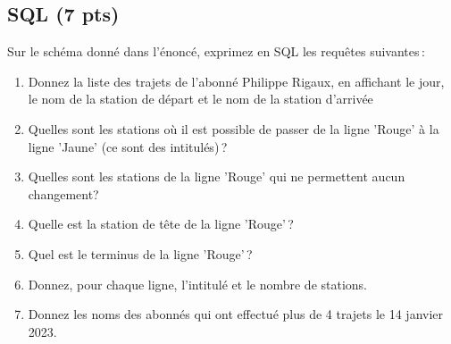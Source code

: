 \subsection*{SQL (7 pts)}

Sur le schéma donné dans l'énoncé, exprimez en SQL les requêtes suivantes\,:

\begin{enumerate}
  \item Donnez la liste des trajets de l'abonné Philippe Rigaux, en affichant le jour, le nom
     de la station de départ et le nom de la station d'arrivée
  
  \item Quelles sont les stations où il est possible de passer de la ligne 'Rouge' à la ligne 'Jaune'
      (ce sont des intitulés)\,?
  
  \item Quelles sont les stations de la ligne 'Rouge' qui ne permettent aucun changement?
 
   \item Quelle est la station de tête de la ligne 'Rouge'\,?

   \item Quel est le terminus de la ligne 'Rouge'\,?
   
   \item Donnez, pour chaque ligne, l'intitulé et le nombre de stations.
   \item Donnez les noms des abonnés qui  ont effectué plus de 4 trajets le 14 janvier 2023.
\end{enumerate}


